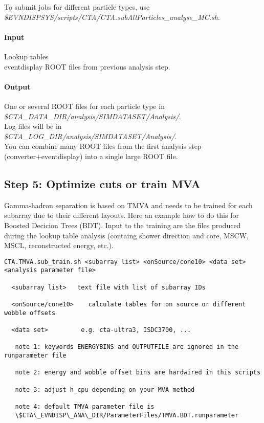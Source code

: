 \documentclass[titlepage,a4paper,twoside,11pt]{report}
\begin{document}
To submit jobs for different particle types, use \\
{\it \$EVNDISPSYS/scripts/CTA/CTA.subAllParticles\_analyse\_MC.sh}.

\paragraph{Input}
Lookup tables \\
eventdisplay ROOT files from previous analysis step.

\paragraph{Output}

One or several ROOT files for each particle type in \\
{\it \$CTA\_DATA\_DIR/analysis/SIMDATASET/Analysis/}. \\
Log files will be in \\
{\it \$CTA\_LOG\_DIR/analysis/SIMDATASET/Analysis/}. \\
You can combine many ROOT files from the first analysis step (converter+eventdisplay) into a single large ROOT file.

\subsection{Step 5: Optimize cuts or train MVA}

Gamma-hadron separation is based on TMVA and needs to be trained for
each subarray due to their different layouts. Here an example how to
do this for Boosted Decicion Trees (BDT).
Input to the training are the files produced during the lookup table analysis 
(containg shower direction and core, MSCW, MSCL, reconstructed energy, etc.).

\begin{lstlisting}
CTA.TMVA.sub_train.sh <subarray list> <onSource/cone10> <data set> <analysis parameter file>

  <subarray list>   text file with list of subarray IDs

  <onSource/cone10>    calculate tables for on source or different wobble offsets

  <data set>         e.g. cta-ultra3, ISDC3700, ...  

   note 1: keywords ENERGYBINS and OUTPUTFILE are ignored in the runparameter file

   note 2: energy and wobble offset bins are hardwired in this scripts

   note 3: adjust h_cpu depending on your MVA method

   note 4: default TMVA parameter file is 
   \$CTA\_EVNDISP\_ANA\_DIR/ParameterFiles/TMVA.BDT.runparameter
\end{lstlisting}
\end{document}
